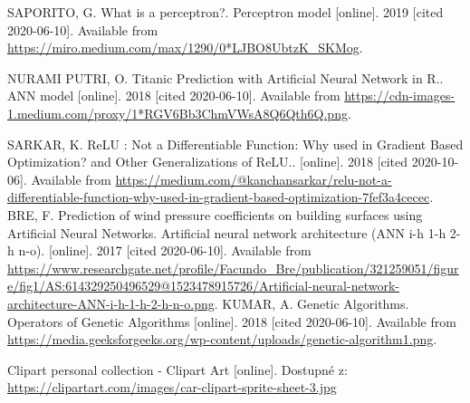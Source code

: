 \documentclass[a4paper,12pt]{article}
\begin{document}
    \bigskip
    \tableofcontents
    \pagebreak
    \listoffigures

    \begin{thebibliography}{7}
            SAPORITO, G. What is a perceptron?. Perceptron model [online]. 2019 [cited 2020-06-10]. 
            Available from \url{https://miro.medium.com/max/1290/0*LJBO8UbtzK_SKMog}.

            NURAMI PUTRI, O. Titanic Prediction with Artificial Neural Network in R.. ANN model 
            [online]. 2018 [cited 2020-06-10]. Available from \url{https://cdn-images-1.medium.com/proxy/1*RGV6Bb3ChmVWsA8Q6Qth6Q.png}.

            SARKAR, K. ReLU : Not a Differentiable Function: 
            Why used in Gradient Based Optimization? and Other Generalizations of ReLU.. [online]. 
            2018 [cited 2020-10-06]. Available from \url{https://medium.com/@kanchansarkar/relu-not-a-differentiable-function-why-used-in-gradient-based-optimization-7fef3a4cecec}.
            BRE, F. Prediction of wind pressure coefficients on building surfaces using 
            Artificial Neural Networks. Artificial neural network architecture (ANN i-h 1-h 2-h n-o). 
            [online]. 2017 [cited 2020-06-10]. Available from \url{https://www.researchgate.net/profile/Facundo_Bre/publication/321259051/figure/fig1/AS:614329250496529@1523478915726/Artificial-neural-network-architecture-ANN-i-h-1-h-2-h-n-o.png}.
            KUMAR, A. Genetic Algorithms. Operators of Genetic Algorithms [online]. 2018 
            [cited 2020-06-10]. Available from \url{https://media.geeksforgeeks.org/wp-content/uploads/genetic-algorithm1.png}.

            Clipart personal collection - Clipart Art [online]. 
            Dostupné z: \url{https://clipartart.com/images/car-clipart-sprite-sheet-3.jpg}

    \end{thebibliography}
\end{document}
